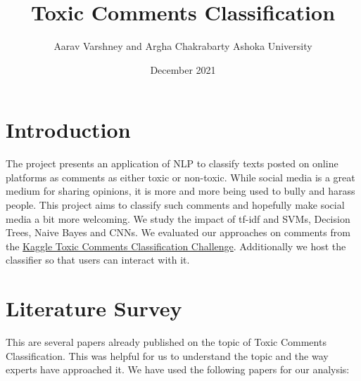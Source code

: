 \documentclass[11pt]{article}
\title{Toxic Comments Classification}
\author{Aarav Varshney and Argha Chakrabarty
\AND
\AND
	Ashoka University
}
\date{December 2021}
\begin{document}
\maketitle

\newpage
\tableofcontents
\thispagestyle{empty}

\newpage
\thispagestyle{empty}

\setcounter{page}{1}
\section{Introduction}
The project presents an application of NLP to classify texts posted on online platforms as
comments as either toxic or non-toxic. While social media is a great medium for sharing opinions,
it is more and more being used to bully and harass people. This project aims to classify such comments
and hopefully make social media a bit more welcoming. We study the impact of tf-idf and SVMs, Decision Trees, Naive Bayes and CNNs.
We evaluated our approaches on comments from the \href{https://www.kaggle.com/c/jigsaw-toxic-comment-classification-challenge}{Kaggle Toxic Comments Classification Challenge}. Additionally
we host the classifier so that users can interact with it.


\section{Literature Survey}
\label{sec:headings}
This are several papers already published on the topic of Toxic Comments Classification. This was helpful for us to understand the topic and the way experts have approached it.
We have used the following papers for our analysis: 
\end{document}
